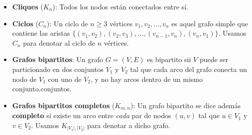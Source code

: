 \begin{itemize}

\item \textbf{Cliques} ($K_n$): Todos los nodos están conectados entre sí.

\begin{center}
\end{center}

\item \textbf{Ciclos} ($C_n$): Un ciclo de $n \geq 3$ vértices $v_1,v_2,\dots,v_n$ es aquel grafo simple que contiene las aristas
$\{(v_1,v_2),(v_2,v_3),\dots,(v_{n-1},v_n),(v_n,v_1)\}$. Usamos $C_n$ para denotar al ciclo de $n$ vértices.

\begin{center}
\end{center}

\item \textbf{Grafos bipartitos}: Un grafo $G=(V,E)$ es bipartito sii $V$ puede ser particionado en dos conjuntos $V_1$ y $V_2$ tal que cada arco del grafo conecta un
nodo de $V_1$ con uno de $V_2$, y no hay arcos dentro de un mismo conjunto.conjuntos.

\begin{center}
\end{center}


\item \textbf{Grafos bipartitos completos} ($K_{m,n}$): Un grafo bipartito se dice además \textbf{completo} si existe un arco entre
\emph{cada} par de nodos $(u,v)$ tal que $u \in V_1$ y $v \in V_2$. Usamos
$K_{|V_1|,|V_2|}$ para denotar a dicho grafo. 


\end{itemize}

